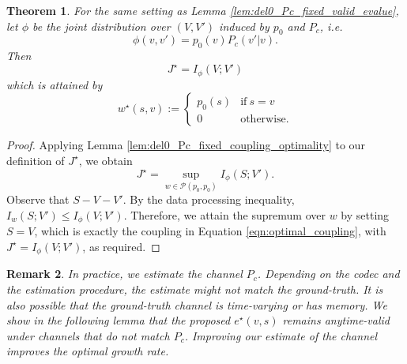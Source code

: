\documentclass[12pt]{article}
\theoremstyle{plain}
\newtheorem{theorem}{Theorem}[section]
\newtheorem{remark}[theorem]{Remark}
\theoremstyle{definition}
\begin{document}
\begin{theorem}
For the same setting as Lemma \ref{lem:del0_Pc_fixed_valid_evalue}, let $\phi$ be the joint distribution over $(V,V')$ induced by $p_0$ and $P_c$, i.e.
\begin{equation}
\phi(v,v')=p_0(v)P_c(v'|v).
\end{equation}
Then
\begin{equation}
    J^\star=I_\phi(V;V')
\end{equation}
which is attained by
\begin{equation}
\label{eqn:optimal_coupling}
    w^\star(s,v):=\begin{cases}
        p_0(s)&\text{if}~s=v\\
        0&\text{otherwise}.
    \end{cases}
\end{equation}
\end{theorem}
\begin{proof}
Applying Lemma \ref{lem:del0_Pc_fixed_coupling_optimality} to our definition of $J^\star$, we obtain
    \begin{equation}
    J^\star =  \sup_{w\in\mathcal{P}(p_0,p_0)} I_\phi(S; V').
\end{equation}
Observe that $S-V-V'$. By the data processing inequality, $I_w(S; V')\leq I_\phi(V; V')$. Therefore, we attain the supremum over $w$ by setting $S=V$, which is exactly the coupling in Equation \ref{eqn:optimal_coupling}, with $J^\star=I_\phi(V;V')$, as required.

\end{proof}

\begin{remark}
    In practice, we estimate the channel $P_c$. Depending on the codec and the estimation procedure, the estimate might not match the ground-truth. It is also possible that the ground-truth channel is time-varying or has memory. We show in the following lemma that the proposed $e^\star(v,s)$ remains anytime-valid under channels that do not match $P_c$. Improving our estimate of the channel improves the optimal growth rate.
\end{remark}
\end{document}
